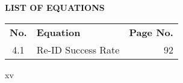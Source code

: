 \documentclass{report}
\begin{document}
	
	\begin{center}
		\textbf{LIST OF EQUATIONS}\\[2em]
		
		\begin{tabular}{clr}
			\textbf{No.} & \textbf{Equation} & \textbf{Page No.} \\[1em]
			4.1 & Re-ID Success Rate & 92 \\
		\end{tabular}
	\end{center}
	
	\vfill
	\begin{center}
		xv
	\end{center}
\end{document}
